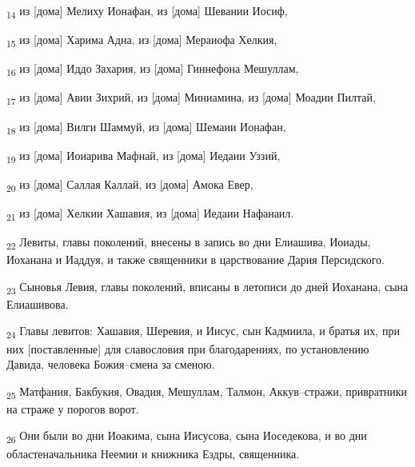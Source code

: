 \begin{tcolorbox}
\textsubscript{14} из [дома] Мелиху Ионафан, из [дома] Шевании Иосиф,
\end{tcolorbox}
\begin{tcolorbox}
\textsubscript{15} из [дома] Харима Адна, из [дома] Мераиофа Хелкия,
\end{tcolorbox}
\begin{tcolorbox}
\textsubscript{16} из [дома] Иддо Захария, из [дома] Гиннефона Мешуллам,
\end{tcolorbox}
\begin{tcolorbox}
\textsubscript{17} из [дома] Авии Зихрий, из [дома] Миниамина, из [дома] Моадии Пилтай,
\end{tcolorbox}
\begin{tcolorbox}
\textsubscript{18} из [дома] Вилги Шаммуй, из [дома] Шемаии Ионафан,
\end{tcolorbox}
\begin{tcolorbox}
\textsubscript{19} из [дома] Иоиарива Мафнай, из [дома] Иедаии Уззий,
\end{tcolorbox}
\begin{tcolorbox}
\textsubscript{20} из [дома] Саллая Каллай, из [дома] Амока Евер,
\end{tcolorbox}
\begin{tcolorbox}
\textsubscript{21} из [дома] Хелкии Хашавия, из [дома] Иедаии Нафанаил.
\end{tcolorbox}
\begin{tcolorbox}
\textsubscript{22} Левиты, главы поколений, внесены в запись во дни Елиашива, Иоиады, Иоханана и Иаддуя, и также священники в царствование Дария Персидского.
\end{tcolorbox}
\begin{tcolorbox}
\textsubscript{23} Сыновья Левия, главы поколений, вписаны в летописи до дней Иоханана, сына Елиашивова.
\end{tcolorbox}
\begin{tcolorbox}
\textsubscript{24} Главы левитов: Хашавия, Шеревия, и Иисус, сын Кадмиила, и братья их, при них [поставленные] для славословия при благодарениях, по установлению Давида, человека Божия--смена за сменою.
\end{tcolorbox}
\begin{tcolorbox}
\textsubscript{25} Матфания, Бакбукия, Овадия, Мешуллам, Талмон, Аккув--стражи, привратники на страже у порогов ворот.
\end{tcolorbox}
\begin{tcolorbox}
\textsubscript{26} Они были во дни Иоакима, сына Иисусова, сына Иоседекова, и во дни областеначальника Неемии и книжника Ездры, священника.
\end{tcolorbox}
